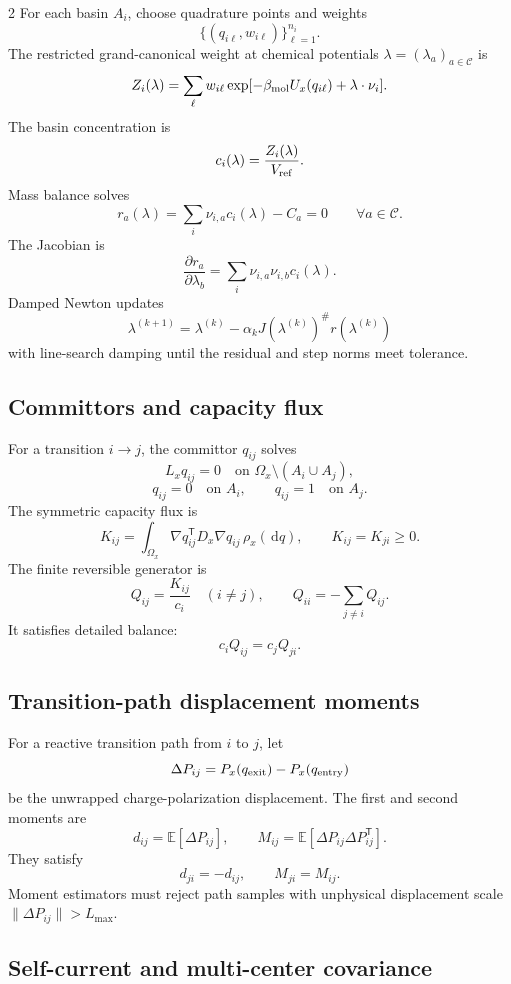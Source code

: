 \documentclass[10pt]{article}
\newcommand{\dd}{\,\mathrm d}
\newcommand{\T}{\mathsf{T}}
\begin{document}
\begin{multicols}{2}
For each basin \(A_i\), choose quadrature points and weights
\[
\{(q_{i\ell},w_{i\ell})\}_{\ell=1}^{n_i}.
\]
The restricted grand-canonical weight at chemical potentials
\(\lambda=(\lambda_a)_{a\in\mathcal C}\) is
\[
Z_i(\lambda)
=
\sum_\ell
w_{i\ell}
\exp[-\beta_{\rm mol}U_x(q_{i\ell})
+\lambda\cdot\nu_i].
\]
The basin concentration is
\[
c_i(\lambda)=\frac{Z_i(\lambda)}{V_{\rm ref}}.
\]
Mass balance solves
\[
r_a(\lambda)
=
\sum_i\nu_{i,a}c_i(\lambda)-C_a
=0
\qquad
\forall a\in\mathcal C.
\]
The Jacobian is
\[
\frac{\partial r_a}{\partial\lambda_b}
=
\sum_i\nu_{i,a}\nu_{i,b}c_i(\lambda).
\]
Damped Newton updates
\[
\lambda^{(k+1)}=\lambda^{(k)}-\alpha_kJ(\lambda^{(k)})^\#r(\lambda^{(k)})
\]
with line-search damping until the residual and step norms meet tolerance.

\subsection{Committors and capacity flux}
\label{sec:fluxes}

For a transition \(i\to j\), the committor \(q_{ij}\) solves
\[
L_x q_{ij}=0
\quad\text{on }\Omega_x\setminus(A_i\cup A_j),
\]
\[
q_{ij}=0\quad\text{on }A_i,
\qquad
q_{ij}=1\quad\text{on }A_j.
\]
The symmetric capacity flux is
\[
K_{ij}
=
\int_{\Omega_x}
\nabla q_{ij}^{\T}D_x\nabla q_{ij}\,\rho_x(\dd q),
\qquad
K_{ij}=K_{ji}\ge0.
\]
The finite reversible generator is
\[
Q_{ij}=\frac{K_{ij}}{c_i}\quad(i\ne j),
\qquad
Q_{ii}=-\sum_{j\ne i}Q_{ij}.
\]
It satisfies detailed balance:
\[
c_iQ_{ij}=c_jQ_{ji}.
\]

\subsection{Transition-path displacement moments}
\label{sec:tpmoments}

For a reactive transition path from \(i\) to \(j\), let
\[
\Delta P_{ij}=P_x(q_{\rm exit})-P_x(q_{\rm entry})
\]
be the unwrapped charge-polarization displacement. The first and second
moments are
\[
d_{ij}=\mathbb E[\Delta P_{ij}],
\qquad
M_{ij}=\mathbb E[\Delta P_{ij}\Delta P_{ij}^{\T}].
\]
They satisfy
\[
d_{ji}=-d_{ij},
\qquad
M_{ji}=M_{ij}.
\]
Moment estimators must reject path samples with unphysical displacement scale
\(\|\Delta P_{ij}\|>L_{\max}\).

\subsection{Self-current and multi-center covariance}
\label{sec:selfcurrent}


\end{multicols}
\end{document}
